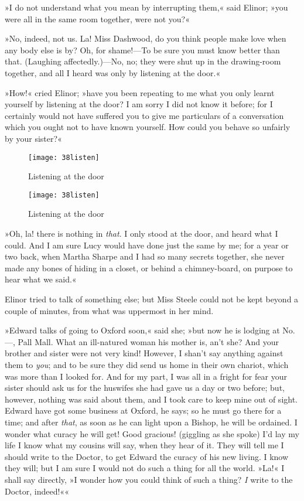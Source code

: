 »I do not understand what you mean by interrupting them,« said Elinor; »you were all in the same room together, were not you?«

»No, indeed, not us. La! Miss Dashwood, do you think people make love when any body else is by? Oh, for shame!—To be sure you must know better than that. (Laughing affectedly.)—No, no; they were shut up in the drawing-room together, and all I heard was only by listening at the door.«

»How!« cried Elinor; »have you been repeating to me what you only learnt yourself by listening at the door? I am sorry I did not know it before; for I certainly would not have suffered you to give me particulars of a conversation which you ought not to have known yourself. How could you behave so unfairly by your sister?«

\begin{a4}
	\begin{figure}[tbph]
		\centering
		\texttt{[image: 38listen]}
		\caption{Listening at the door}
	\end{figure}
\end{a4}


\begin{letter}
	\begin{figure}[tbph]
		\centering
		\texttt{[image: 38listen]}
		\caption{Listening at the door}
	\end{figure}
\end{letter}



»Oh, la! there is nothing in \textit{that}. I only stood at the door, and heard what I could. And I am sure Lucy would have done just the same by me; for a year or two back, when Martha Sharpe and I had so many secrets together, she never made any bones of hiding in a closet, or behind a chimney-board, on purpose to hear what we said.«

Elinor tried to talk of something else; but Miss Steele could not be kept beyond a couple of minutes, from what was uppermost in her mind.

»Edward talks of going to Oxford soon,« said she; »but now he is lodging at No.—, Pall Mall. What an ill-natured woman his mother is, an’t she? And your brother and sister were not very kind! However, I shan’t say anything against them to \textit{you}; and to be sure they did send us home in their own chariot, which was more than I looked for. And for my part, I was all in a fright for fear your sister should ask us for the huswifes she had gave us a day or two before; but, however, nothing was said about them, and I took care to keep mine out of sight. Edward have got some business at Oxford, he says; so he must go there for a time; and after \textit{that}, as soon as he can light upon a Bishop, he will be ordained. I wonder what curacy he will get! Good gracious! (giggling as she spoke) I’d lay my life I know what my cousins will say, when they hear of it. They will tell me I should write to the Doctor, to get Edward the curacy of his new living. I know they will; but I am sure I would not do such a thing for all the world. »La!« I shall say directly, »I wonder how you could think of such a thing? \textit{I} write to the Doctor, indeed!««

